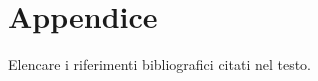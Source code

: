 \documentclass[12pt]{article}
\begin{document}
\section*{Appendice}



\newpage


\begin{thebibliography}
    Elencare i riferimenti bibliografici citati nel testo.
\end{thebibliography}

\end{document}
